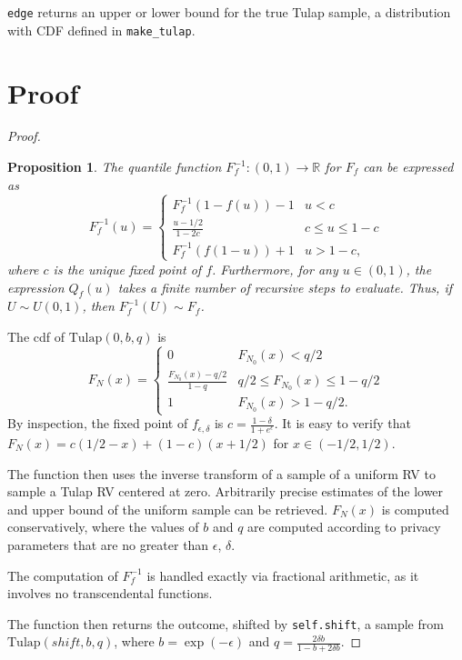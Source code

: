 \documentclass{article}
\newtheorem{prop}{Proposition}
\begin{document}
\texttt{edge} returns an upper or lower bound for the true Tulap sample,
a distribution with CDF defined in \texttt{make\_tulap}.

\section{Proof}

\begin{proof} 

\begin{prop}\label{prop1}   %
    The quantile function $F_f^{-1}:(0,1)\rightarrow \mathbb{R}$ for $F_f$ can be expressed as
    \[F_f^{-1}(u) = \begin{cases}
    F_f^{-1}(1-f(u))-1&u<c\\
    \frac{u-1/2}{1-2c}&c\leq u\leq 1-c\\
    F_f^{-1}(f(1-u))+1&u>1-c,
    \end{cases}\]
    where $c$ is the unique fixed point of $f$. 
    {Furthermore, for any $u\in (0,1)$, the expression $Q_f(u)$ takes a finite number of recursive steps to evaluate. Thus,} 
    if $U\sim U(0,1)$, then $F_f^{-1}(U) \sim F_f$. 
\end{prop}

The cdf of $\mathrm{Tulap}(0,b,q)$ is
\[F_N(x) = \begin{cases}
    0&F_{N_0}(x)<q/2\\
    \frac{F_{N_0}(x)-q/2}{1-q}& q/2\leq F_{N_0}(x)\leq 1-q/2\\
    1&F_{N_0}(x)>1-q/2.
\end{cases}\]
By inspection, the fixed point of $f_{\epsilon,\delta}$ is $c=\frac{1-\delta}{1+e^\epsilon}$. 
It is easy to verify that $F_N(x) = c(1/2-x) + (1-c)(x+1/2)$ for $x\in (-1/2,1/2)$. 

The function then uses the inverse transform of a sample of a uniform RV to sample a Tulap RV centered at zero.
Arbitrarily precise estimates of the lower and upper bound of the uniform sample can be retrieved.
$F_N(x)$ is computed conservatively, 
where the values of $b$ and $q$ are computed according to privacy parameters that are no greater than $\epsilon$, $\delta$.

The computation of $F_f^{-1}$ is handled exactly via fractional arithmetic, 
as it involves no transcendental functions.

The function then returns the outcome, shifted by \texttt{self.shift}, a sample from $\mathrm{Tulap}(shift,b,q)$,
where $b = \exp(-\epsilon)$ and $q = \frac{2\delta b}{1-b+2\delta b}$.


\end{proof}
\end{document}
